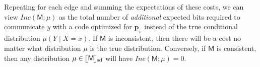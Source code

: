 \documentclass{article}
\theoremstyle{plain}
\theoremstyle{definition}
\theoremstyle{remark}
\newcommand\mat[1]{\mathbf{#1}}
\DeclarePairedDelimiter{\SD}{\llbracket}{\rrbracket_{\text{sd}}}
\newcommand{\bp}[1][L]{\mat{p}_{\!_{#1}\!}}
\newcommand{\sfM}{\mathsf M}
\newcommand\inconsist{\mathit{Inc}}
\numberwithin{equation}{section}
\begin{document}
{		Repeating for each edge and summing the expectations of these costs, we can view
		$\inconsist(\sfM;\mu)$ as the total number of \emph{additional} expected
        bits required to communicate $y$ with a code optimized for
        $\bp$ instead of the true conditional distribution
                $\mu(Y \mid X=x)$. 
	If $\sfM$ is inconsistent, then there will be a cost no matter
        what distribution $\mu$ is the true distribution.
	Conversely, if $\sfM$ is consistent, then any distribution
        $\mu \in \SD{\sfM}$ will have $\inconsist(\sfM; \mu) = 0$.  
}	
\end{document}
